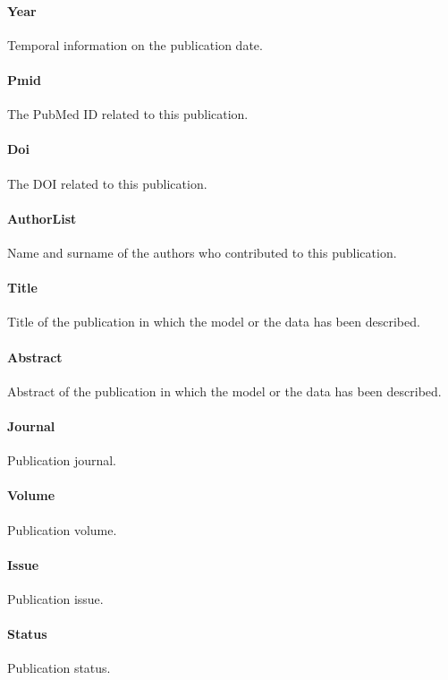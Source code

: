 \documentclass[a4paper]{report}
\begin{document}
\paragraph{Year}
Temporal information on the publication date.

\paragraph{Pmid}
The PubMed ID related to this publication.

\paragraph{Doi}
The DOI related to this publication.

\paragraph{AuthorList}
Name and surname of the authors who contributed to this publication.

\paragraph{Title}
Title of the publication in which the model or the data has been described.

\paragraph{Abstract}
Abstract of the publication in which the model or the data has been described.

\paragraph{Journal}
Publication journal.

\paragraph{Volume}
Publication volume.

\paragraph{Issue}
Publication issue.

\paragraph{Status}
Publication status.
\end{document}
